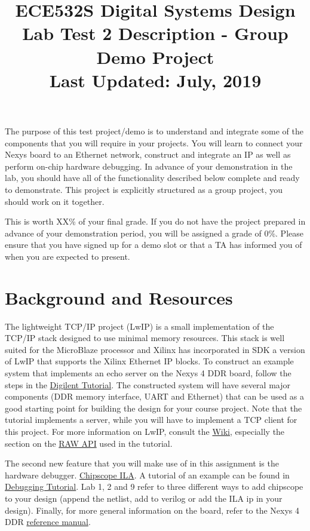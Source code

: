 \documentclass[11pt]{article}
\title{ECE532S Digital Systems Design \\ \vspace{0.4cm}
       \Large Lab Test 2 Description - Group Demo Project \\ \vspace{0.4cm}
       \small Last Updated: July, 2019}
\author{ }
\date{ }
\begin{document}
\maketitle
\vspace{-1cm}

The purpose of this test project/demo is to understand and integrate some of the components that you will require in your projects. You will learn to connect your Nexys board to an Ethernet network, construct and integrate an IP as well as perform on-chip hardware debugging. In advance of your demonstration in the lab, you should have all of the functionality described below complete and ready to demonstrate. This project is explicitly structured as a group project, you should work on it together.

This is worth XX\% of your final grade. If you do not have the project prepared in advance of your demonstration period, you will be assigned a grade of 0\%. Please ensure that you have signed up for a demo slot or that a TA has informed you of when you are expected to present.




\section{Background and Resources}
\label{sec:back}
The lightweight TCP/IP project (LwIP) is a small implementation of the TCP/IP stack designed to use minimal memory resources.
This stack is well suited for the MicroBlaze processor and Xilinx has incorporated in SDK a version of LwIP that supports the Xilinx Ethernet IP blocks.
To construct an example system that implements an echo server on the Nexys 4 DDR board, follow the steps in the
\href{https://reference.digilentinc.com/learn/programmable-logic/tutorials/nexys-4-ddr-getting-started-with-microblaze-servers/start}{\color{blue}Digilent Tutorial}.
The constructed system will have several major components (DDR memory interface, UART and Ethernet) that can be used as a good starting point for building the design for your course project.
Note that the tutorial implements a server, while you will have to implement a TCP client for this project.
For more information on LwIP, consult the \href{http://lwip.wikia.com/wiki/LwIP_Wiki}{\color{blue}Wiki}, especially the section on the \href{http://lwip.wikia.com/wiki/Raw/TCP}{\color{blue}RAW API} used in the tutorial.

The second new feature that you will make use of in this assignment is the hardware debugger.
\href{https://www.xilinx.com/support/documentation/ip_documentation/ila/v6_2/pg172-ila.pdf}{\color{blue}Chipscope ILA}. A tutorial of an example can be found in \href{https://www.xilinx.com/support/documentation/sw_manuals/xilinx2017_2/ug936-vivado-tutorial-programming-debugging.pdf}{\color{blue}Debugging Tutorial}. Lab 1, 2 and 9 refer to three different ways to add chipscope to your design (append the netlist, add to verilog or add the ILA ip in your design). Finally, for more general information on the board, refer to the Nexys 4 DDR \href{https://reference.digilentinc.com/reference/programmable-logic/nexys-4-ddr/reference-manual}{\color{blue}reference manual}.
\end{document}
